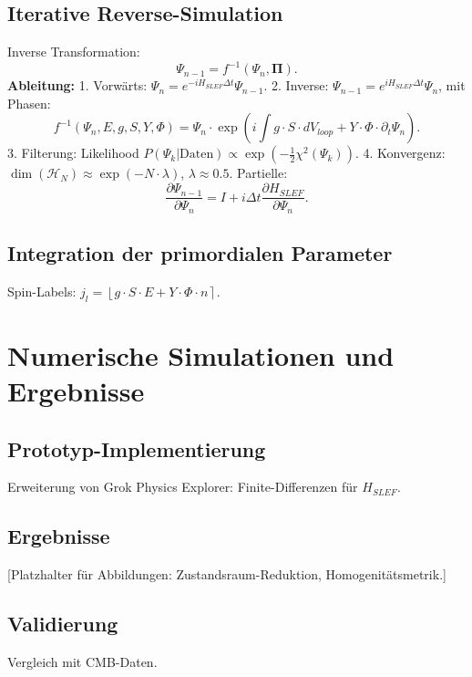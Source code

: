 \documentclass[11pt,a4paper]{article}
\begin{document}
	\subsection{Iterative Reverse-Simulation}
	Inverse Transformation:
	\begin{equation}
		\Psi_{n-1} = f^{-1}(\Psi_n, \mathbf{\Pi}).
	\end{equation}
	\textbf{Ableitung:}  
	1. Vorwärts: $\Psi_n = e^{-i H_{SLEF} \Delta t} \Psi_{n-1}$.  
	2. Inverse: $\Psi_{n-1} = e^{i H_{SLEF} \Delta t} \Psi_n$, mit Phasen:  
	\begin{equation}
		f^{-1}(\Psi_n, E, g, S, Y, \Phi) = \Psi_n \cdot \exp\left( i \int g \cdot S \cdot dV_{loop} + Y \cdot \Phi \cdot \partial_t \Psi_n \right).
	\end{equation}
	3. Filterung: Likelihood $P(\Psi_k | \text{Daten}) \propto \exp\left( -\frac{1}{2} \chi^2(\Psi_k) \right)$.  
	4. Konvergenz: $\dim(\mathcal{H}_N) \approx \exp(-N \cdot \lambda)$, $\lambda \approx 0.5$. Partielle:  
	\begin{equation}
		\frac{\partial \Psi_{n-1}}{\partial \Psi_n} = I + i \Delta t \frac{\partial H_{SLEF}}{\partial \Psi_n}.
	\end{equation}
	
	\subsection{Integration der primordialen Parameter}
	Spin-Labels: $j_l = \left\lfloor g \cdot S \cdot E + Y \cdot \Phi \cdot n \right\rceil$.
	
	\section{Numerische Simulationen und Ergebnisse}
	
	\subsection{Prototyp-Implementierung}
	Erweiterung von Grok Physics Explorer: Finite-Differenzen für $H_{SLEF}$.
	
	\subsection{Ergebnisse}
	[Platzhalter für Abbildungen: Zustandsraum-Reduktion, Homogenitätsmetrik.]
	
	\subsection{Validierung}
	Vergleich mit CMB-Daten.
	
\end{document}
